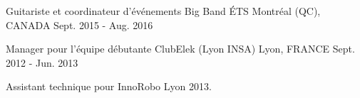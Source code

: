 


\begin{cventries}

\cventry
{Guitariste et coordinateur d'événements} %
{Big Band ÉTS} %
{\hspace{-5mm}Montréal (QC), CANADA} %
{Sept. 2015 - Aug. 2016} %
{ %
}

\cventry
{Manager pour l'équipe débutante} %
{ClubElek (Lyon INSA)} %
{Lyon, FRANCE} %
{Sept. 2012 - Jun. 2013} %
{ %
\begin{cvitems}
\item{Assistant technique pour InnoRobo Lyon 2013.}
\end{cvitems}
}

\end{cventries}
